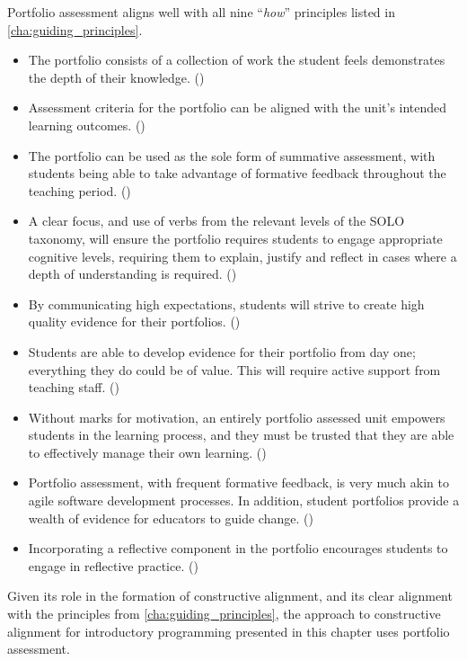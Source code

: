 %
%
Portfolio assessment aligns well with all nine ``\emph{how}'' principles listed in \cref{cha:guiding_principles}. 
\begin{itemize}[noitemsep,nolistsep]
	\item The portfolio consists of a collection of work the student feels demonstrates the depth of their knowledge. ()
	\item Assessment criteria for the portfolio can be aligned with the unit's intended learning outcomes. ()
	\item The portfolio can be used as the sole form of summative assessment, with students being able to take advantage of formative feedback throughout the teaching period. ()
	\item A clear focus, and use of verbs from the relevant levels of the SOLO taxonomy, will ensure the portfolio requires students to engage appropriate cognitive levels, requiring them to explain, justify and reflect in cases where a depth of understanding is required. ()
	\item By communicating high expectations, students will strive to create high quality evidence for their portfolios. ()
	\item Students are able to develop evidence for their portfolio from day one; everything they do could be of value. This will require active support from teaching staff. ()
	\item Without marks for motivation, an entirely portfolio assessed unit empowers students in the learning process, and they must be trusted that they are able to effectively manage their own learning. ()
	\item Portfolio assessment, with frequent formative feedback, is very much akin to agile software development processes. In addition, student portfolios provide a wealth of evidence for educators to guide change. ()
	\item Incorporating a reflective component in the portfolio encourages students to engage in reflective practice. ()
\end{itemize}

Given its role in the formation of constructive alignment, and its clear alignment with the principles from \cref{cha:guiding_principles}, the approach to constructive alignment for introductory programming presented in this chapter uses portfolio assessment.


